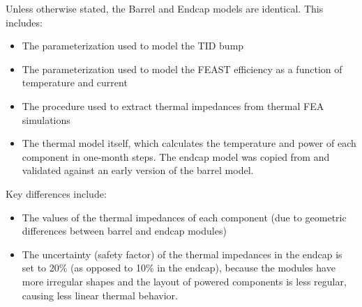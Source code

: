 Unless otherwise stated, the Barrel and Endcap models are identical. This includes:
\begin{itemize}
  \item The parameterization used to model the TID bump
  \item The parameterization used to model the FEAST efficiency as a function of temperature 
    and current
  \item The procedure used to extract thermal impedances from thermal FEA simulations
  \item The thermal model itself, which calculates the temperature and power of each component in 
    one-month steps. The endcap model was copied from and validated against an early version
    of the barrel model.
\end{itemize}

Key differences include:
\begin{itemize}
  \item The values of the thermal impedances of each component (due to geometric differences between
    barrel and endcap modules)
  \item The uncertainty (safety factor) of the thermal impedances in the endcap is set to 20\% (as
    opposed to 10\% in the endcap), because the modules have more irregular shapes and the layout of
    powered components is less regular, causing less linear thermal behavior.
\end{itemize}
